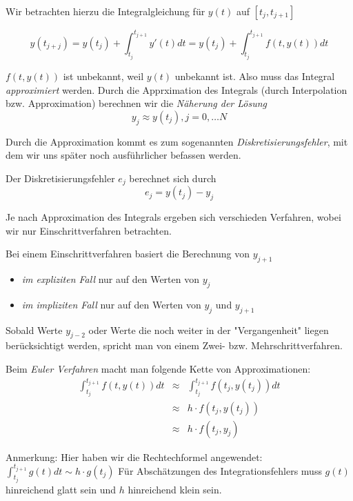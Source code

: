 \documentclass[10pt,a4paper]{article}
\begin{document}
Wir betrachten hierzu die Integralgleichung für $y(t)$ auf $[t_j,t_{j+1}]$

$$y(t_{j+j})=y(t_j)+ \int^{t_{j+1}}_{t_j} y'(t) dt=y(t_j)+ \int^{t_{j+1}}_{t_j} f(t,y(t))dt$$

$f(t,y(t))$ ist unbekannt, weil $y(t)$ unbekannt ist. Also muss das Integral \emph{approximiert} werden. Durch die Apprximation des Integrals (durch Interpolation bzw. Approximation) berechnen wir die \emph{Näherung der Lösung} $$y_j \approx y(t_j), j=0,\ldots N$$

Durch die Approximation kommt es zum sogenannten \emph{Diskretisierungsfehler}, mit dem wir uns später noch ausführlicher befassen werden.

\begin{defi}[Disktretisierungsfehler $e_j$]
Der Diskretisierungsfehler $e_j$ berechnet sich durch $$e_j = y(t_j)-y_j$$
\end{defi}

Je nach Approximation des Integrals ergeben sich verschieden Verfahren, wobei wir nur Einschrittverfahren betrachten.

\begin{defi}[Einschrittverfahren]
Bei einem Einschrittverfahren basiert die Berechnung von $y_{j+1}$
\begin{itemize}
\item \emph{im expliziten Fall} nur auf den Werten von $y_j$
\item \emph{im impliziten Fall} nur auf den Werten von $y_j$ und $y_{j+1}$
\end{itemize}
\noindent Sobald Werte $y_{j-2}$ oder Werte die noch weiter in der "Vergangenheit" liegen berücksichtigt werden, spricht man von einem Zwei- bzw. Mehrschrittverfahren.
\end{defi}


Beim \emph{Euler Verfahren} macht man folgende Kette von Approximationen:
\begin{eqnarray*}
\int^{t_{j+1}}_{t_j} f(t,y(t))dt & \approx & \int^{t_{j+1}}_{t_j} f(t_j,y(t_j))dt \\
 & \approx & h \cdot f(t_j,y(t_j)) \\
 & \approx & h \cdot f(t_j,y_j)
\end{eqnarray*}


Anmerkung: Hier haben wir die Rechtechformel angewendet: $\int_{t_j}^{t_{j+1}}g(t)dt \sim h \cdot g(t_j)$ 
Für Abschätzungen des Integrationsfehlers muss $g(t)$ hinreichend glatt sein und $h$ hinreichend klein sein.
\end{document}
